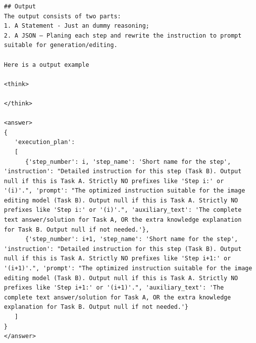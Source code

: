 \documentclass{article} %
\begin{document}
\begin{tcolorbox}[
    colback=lightgray!10,
    colframe=black,
    title={\textbf{Planner Interleaved System Prompt}},
    breakable
]
\begin{Verbatim}[breaklines=true, breaksymbol={}, fontsize=\tiny]
## Output
The output consists of two parts:
1. A Statement - Just an dummy reasoning;
2. A JSON — Planing each step and rewrite the instruction to prompt suitable for generation/editing.

Here is a output example

<think>

</think>

<answer>
{
   'execution_plan': 
   [
      {'step_number': i, 'step_name': 'Short name for the step', 'instruction': "Detailed instruction for this step (Task B). Output null if this is Task A. Strictly NO prefixes like 'Step i:' or '(i)'.", 'prompt': "The optimized instruction suitable for the image editing model (Task B). Output null if this is Task A. Strictly NO prefixes like 'Step i:' or '(i)'.", 'auxiliary_text': 'The complete text answer/solution for Task A, OR the extra knowledge explanation for Task B. Output null if not needed.'},
      {'step_number': i+1, 'step_name': 'Short name for the step', 'instruction': "Detailed instruction for this step (Task B). Output null if this is Task A. Strictly NO prefixes like 'Step i+1:' or '(i+1)'.", 'prompt': "The optimized instruction suitable for the image editing model (Task B). Output null if this is Task A. Strictly NO prefixes like 'Step i+1:' or '(i+1)'.", 'auxiliary_text': 'The complete text answer/solution for Task A, OR the extra knowledge explanation for Task B. Output null if not needed.'}
   ]
}
</answer>
\end{Verbatim}
\end{tcolorbox}
\end{document}
